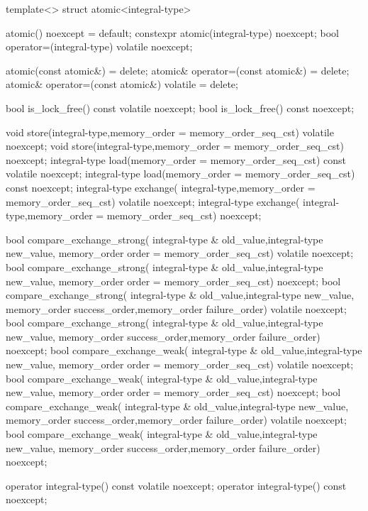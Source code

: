 \begin{cpp}
template<>
struct atomic<integral-type>
{
  atomic() noexcept = default;
  constexpr atomic(integral-type) noexcept;
  bool operator=(integral-type) volatile noexcept;

  atomic(const atomic&) = delete;
  atomic& operator=(const atomic&) = delete;
  atomic& operator=(const atomic&) volatile = delete;

  bool is_lock_free() const volatile noexcept;
  bool is_lock_free() const noexcept;

  void store(integral-type,memory_order = memory_order_seq_cst)
      volatile noexcept;
  void store(integral-type,memory_order = memory_order_seq_cst) noexcept;
  integral-type load(memory_order = memory_order_seq_cst)
      const volatile noexcept;
  integral-type load(memory_order = memory_order_seq_cst) const noexcept;
  integral-type exchange(
      integral-type,memory_order = memory_order_seq_cst)
      volatile noexcept;
 integral-type exchange(
      integral-type,memory_order = memory_order_seq_cst) noexcept;

  bool compare_exchange_strong(
      integral-type & old_value,integral-type new_value,
      memory_order order = memory_order_seq_cst) volatile noexcept;
  bool compare_exchange_strong(
      integral-type & old_value,integral-type new_value,
      memory_order order = memory_order_seq_cst) noexcept;
  bool compare_exchange_strong(
      integral-type & old_value,integral-type new_value,
      memory_order success_order,memory_order failure_order)
      volatile noexcept;
  bool compare_exchange_strong(
      integral-type & old_value,integral-type new_value,
      memory_order success_order,memory_order failure_order) noexcept;
  bool compare_exchange_weak(
      integral-type & old_value,integral-type new_value,
      memory_order order = memory_order_seq_cst) volatile noexcept;
  bool compare_exchange_weak(
      integral-type & old_value,integral-type new_value,
      memory_order order = memory_order_seq_cst) noexcept;
  bool compare_exchange_weak(
      integral-type & old_value,integral-type new_value,
      memory_order success_order,memory_order failure_order)
      volatile noexcept;
  bool compare_exchange_weak(
      integral-type & old_value,integral-type new_value,
      memory_order success_order,memory_order failure_order) noexcept;

  operator integral-type() const volatile noexcept;
  operator integral-type() const noexcept;

}
\end{cpp}
